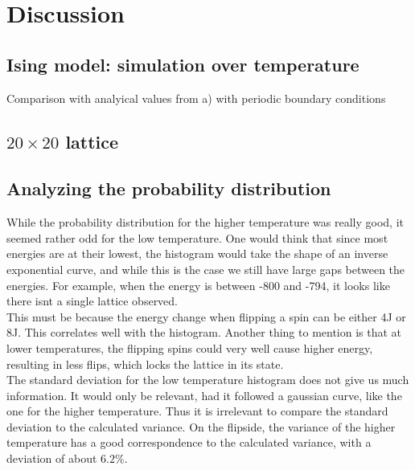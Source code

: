 \documentclass[../main.tex]{subfiles}
\begin{document}
\section{Discussion}

\subsection{Ising model: simulation over temperature}
Comparison with analyical values from a) with periodic boundary conditions

\subsection{$20 \times 20$ lattice}

\subsection{Analyzing the probability distribution}
While the probability distribution for the higher temperature was really good, it seemed rather odd for the low temperature. One would think that since most energies are at their lowest, the histogram would take the shape of an inverse exponential curve, and while this is the case we still have large gaps between the energies. For example, when the energy is between -800 and -794, it looks like there isnt a single lattice observed. \\
This must be because the energy change when flipping a spin can be either 4J or 8J. This correlates well with the histogram. Another thing to mention is that at lower temperatures, the flipping spins could very well cause higher energy, resulting in less flips, which locks the lattice in its state. \\
The standard deviation for the low temperature histogram does not give us much information. It would only be relevant, had it followed a gaussian curve, like the one for the higher temperature. Thus it is irrelevant to compare the standard deviation to the calculated variance. On the flipside, the variance of the higher temperature has a good correspondence to the calculated variance, with a deviation of about $6.2\%$.

\end{document}
